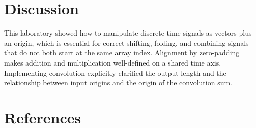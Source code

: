 \documentclass[12pt,a4paper]{article}
\begin{document}
\section{Discussion}
This laboratory showed how to manipulate discrete-time signals as vectors plus an origin, which is essential for correct shifting, folding, and combining signals that do not both start at the same array index. Alignment by zero-padding makes addition and multiplication well-defined on a shared time axis. Implementing convolution explicitly clarified the output length and the relationship between input origins and the origin of the convolution sum.

\section{References}
\end{document}
